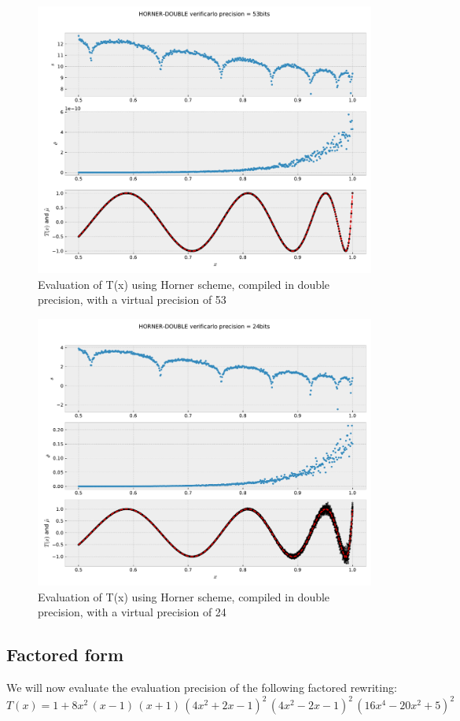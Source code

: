 \documentclass{TP}
\begin{document}
\begin{figure}[htb]
\center \includegraphics[width=.8\textwidth]{HORNER-DOUBLE-53.pdf}
  \caption{Evaluation of T(x) using Horner scheme, compiled in double precision, with a virtual precision of 53}
  \label{fig:horner:double:53}
\end{figure}
\begin{figure}[htb]
\center \includegraphics[width=.8\textwidth]{HORNER-DOUBLE-24.pdf}
  \caption{Evaluation of T(x) using Horner scheme, compiled in double precision, with a virtual precision of 24}
  \label{fig:horner:double:24}
\end{figure}


\FloatBarrier

\subsection{Factored form}

We will now evaluate the evaluation precision of the following factored rewriting:
\[
	T(x) = 1 + 8x^2\,(x-1)\,(x+1)\,(4x^2 + 2x - 1)^2\, (4x^2 - 2x - 1)^2\,(16x^4 - 20x^2 + 5)^2
\]
\end{document}
